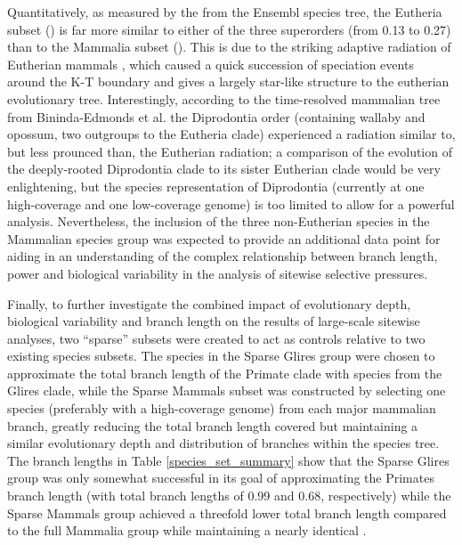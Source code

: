 Quantitatively, as measured by the \mpl from the Ensembl species tree,
the Eutheria subset () is far more similar to either of the
three superorders (\mpl from 0.13 to 0.27) than to the Mammalia subset
(). This is due to the striking adaptive radiation of
Eutherian mammals \citep{Archibald1999,BinindaEmonds2007}, which
caused a quick succession of speciation events around the K-T boundary
and gives a largely star-like structure to the eutherian evolutionary
tree. Interestingly, according to the time-resolved mammalian tree
from Bininda-Edmonds et al. \citeyearpar{BinindaEmonds2007} the
Diprodontia order (containing wallaby and opossum, two outgroups to
the Eutheria clade) experienced a radiation similar to, but less
prounced than, the Eutherian radiation; a comparison of the evolution
of the deeply-rooted Diprodontia clade to its sister Eutherian clade
would be very enlightening, but the species representation of
Diprodontia (currently at one high-coverage and one low-coverage
genome) is too limited to allow for a powerful analysis. Nevertheless,
the inclusion of the three non-Eutherian species in the Mammalian
species group was expected to provide an additional data point for
aiding in an understanding of the complex relationship between branch
length, power and biological variability in the analysis of sitewise
selective pressures.

Finally, to further investigate the combined impact of evolutionary
depth, biological variability and branch length on the results of
large-scale sitewise analyses, two ``sparse'' subsets were created to
act as controls relative to two existing species subsets. The species
in the Sparse Glires group were chosen to approximate the total branch
length of the Primate clade with species from the Glires clade, while
the Sparse Mammals subset was constructed by selecting one species
(preferably with a high-coverage genome) from each major mammalian
branch, greatly reducing the total branch length covered but
maintaining a similar evolutionary depth and distribution of branches
within the species tree. The branch lengths in Table
\ref{species_set_summary} show that the Sparse Glires group was only
somewhat successful in its goal of approximating the Primates branch
length (with total branch lengths of 0.99 and 0.68, respectively)
while the Sparse Mammals group achieved a threefold lower total branch
length compared to the full Mammalia group while maintaining a nearly
identical \mpl.

